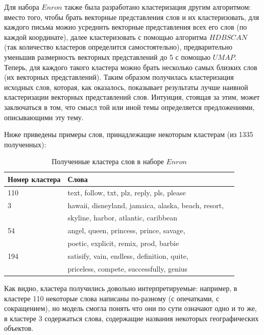 Для набора $Enron$ также была разработано кластеризация другим алгоритмом:
вместо того, чтобы брать векторные представления слов и их кластеризовать, для каждого 
письма можно усреднить векторные представления всех его слов (по каждой координате), далее 
кластеризовать с помощью алгоритма $HDBSCAN$ (так количество кластеров определится самостоятельно), предварительно уменьшив размерность векторных представлений
до 5 с помощью $UMAP$. Теперь, для каждого такого кластера можно брать несколько самых
близких слов (их векторных представлений). Таким образом получилась кластеризация исходных слов, которая, как оказалось, показывает результаты лучше наивной кластеризации векторных
представлений слов. Интуиция, стоящая за этим, может заключаться в том, что смысл той или иной темы определяется предложениями, описывающими эту тему.


Ниже приведены примеры слов, принадлежащие некоторым кластерам (из 1335 полученных):

\begin{table}[H]
\centering
\begin{tabular}{ | l | l | l | }
\hline
Номер кластера & Слова \\ \hline
110 & text, follow, txt, plz, reply, pls, please \\ \hline
3 & hawaii, disneyland, jamaica, alaska, beach, resort,
\\ & skyline, harbor, atlantic, caribbean \\ \hline
54 & angel, queen, princess, prince, savage,
\\ & poetic, explicit, remix, prod, barbie \\ \hline
194 & satisify, vain, endless, definition, quite,
\\ & priceless, compete, successfully, genius \\ \hline
\end{tabular}
\caption{Полученные кластера слов в наборе $Enron$}
\end{table}

Как видно, кластера получились довольно интерпретируемые: например, в кластере 110
некоторые слова написаны по-разному (с опечатками, с сокращением), но модель смогла понять что они по сути означают одно и то же, в кластере 3 содержаться слова, содержащие
названия некоторых географических объектов.
